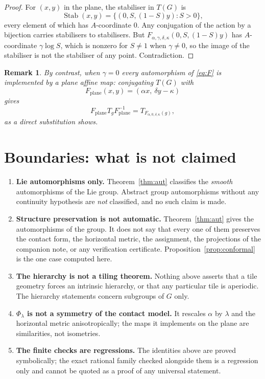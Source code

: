 \documentclass[11pt]{article}
\newtheorem{remark}[theorem]{Remark}
\begin{document}
\begin{proof}
For $(x,y)$ in the plane, the stabiliser in $T(G)$ is
\[
\operatorname{Stab}(x,y)=\bigl\{(0,S,(1-S)y):S>0\bigr\},
\]
every element of which has $A$-coordinate $0$. Any conjugation of the action by a
bijection carries stabilisers to stabilisers. But
$F_{\alpha,\gamma,\delta,\kappa}(0,S,(1-S)y)$ has $A$-coordinate
$\gamma\log S$, which is nonzero for $S\ne1$ when $\gamma\ne0$, so the image of
the stabiliser is not the stabiliser of any point. Contradiction.
\end{proof}

\begin{remark}
By contrast, when $\gamma=0$ every automorphism of \eqref{eq:F} \emph{is}
implemented by a plane affine map: conjugating $T(G)$ with
\[
F_{\mathrm{plane}}(x,y)=(\alpha x,\ \delta y-\kappa)
\]
gives
\[
F_{\mathrm{plane}}T_gF_{\mathrm{plane}}^{-1}=T_{F_{\alpha,0,\delta,\kappa}(g)},
\]
as a direct substitution shows.
\end{remark}

\section{Boundaries: what is not claimed}
\label{sec:boundaries}

\begin{enumerate}
\item \textbf{Lie automorphisms only.} Theorem~\ref{thm:aut} classifies the
\emph{smooth} automorphisms of the Lie group. Abstract group automorphisms
without any continuity hypothesis are \emph{not} classified, and no such claim is
made.
\item \textbf{Structure preservation is not automatic.} Theorem~\ref{thm:aut}
gives the automorphisms of the group. It does not say that every one of them
preserves the contact form, the horizontal metric, the assignment, the
projections of the companion note, or any verification certificate.
Proposition~\ref{prop:conformal} is the one case computed here.
\item \textbf{The hierarchy is not a tiling theorem.} Nothing above asserts that
a tile geometry forces an intrinsic hierarchy, or that any particular tile is
aperiodic. The hierarchy statements concern subgroups of $G$ only.
\item \textbf{$\Phi_\lambda$ is not a symmetry of the contact model.} It rescales
$\alpha$ by $\lambda$ and the horizontal metric anisotropically; the maps it
implements on the plane are similarities, not isometries.
\item \textbf{The finite checks are regressions.} The identities above are proved
symbolically; the exact rational family checked alongside them is a regression
only and cannot be quoted as a proof of any universal statement.
\end{enumerate}
\end{document}

